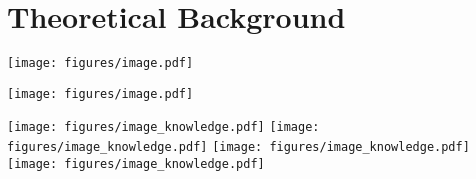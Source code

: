 
\chapter{Theoretical Background} %

\label{ChapterX} %


\texttt{[image: figures/image.pdf]}


\begin{center}
    \texttt{[image: figures/image.pdf]}
\end{center}

\texttt{[image: figures/image\_knowledge.pdf]}
\texttt{[image: figures/image\_knowledge.pdf]}
\texttt{[image: figures/image\_knowledge.pdf]}
\texttt{[image: figures/image\_knowledge.pdf]}


